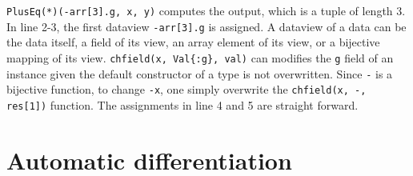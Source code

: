 \documentclass[aps,twocolumn,longbibliography,english,superscriptaddress]{revtex4-1}
\newcommand{\<}{\langle}
\renewcommand{\>}{\rangle}
\theoremstyle{definition}\newtheorem{definition}{\textit{Definition}}
\begin{document}
\texttt{PlusEq(*)(-arr[3].g, x, y)} computes the output, which is a tuple of length $3$.
In line 2-3, the first dataview \texttt{-arr[3].g} is assigned.
A dataview of a data can be the data itself, a field of its view, an array element of its view, or a bijective mapping of its view.
\texttt{chfield(x, Val\{:g\}, val)} can modifies the \texttt{g} field of an instance given the default constructor of a type is not overwritten.
Since \texttt{-} is a bijective function, to change \texttt{-x}, one simply overwrite the \texttt{chfield(x, -, res[1])} function.
The assignments in line 4 and 5 are straight forward.

\section{Automatic differentiation}\label{sec:bp}
\end{document}

